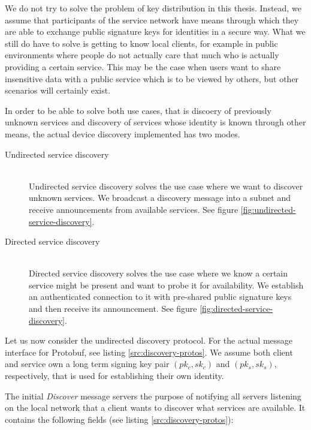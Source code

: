 We do not try to solve the problem of key distribution in this thesis.
Instead, we assume that participants of the service network have means through which they are able to exchange public signature keys for identities in a secure way.
What we still do have to solve is getting to know local clients, for example in public environments where people do not actually care that much who is actually providing a certain service.
This may be the case when users want to share insensitive data with a public service which is to be viewed by others, but other scenarios will certainly exist.

In order to be able to solve both use cases, that is discoery of previously unknown services and discovery of services whose identity is known through other means, the actual device discovery implemented has two modes.
\begin{description}
    \item[Undirected service discovery]\hfill\\
        Undirected service discovery solves the use case where we want to discover unknown services.
        We broadcast a discovery  message into a subnet and receive announcements from available services.
        See figure \ref{fig:undirected-service-discovery}.
    \item[Directed service discovery]\hfill\\
        Directed service discovery solves the use case where we know a certain service might be present and want to probe it for availability.
        We establish an authenticated connection to it with pre-shared public signature keys and then receive its announcement.
        See figure \ref{fig:directed-service-discovery}.
\end{description}

Let us now consider the undirected discovery protocol.
For the actual message interface for Protobuf, see listing \ref{src:discovery-protos}.
We assume both client and service own a long term signing key pair $(pk_c, sk_c)$ and $(pk_s, sk_s)$, respectively, that is used for establishing their own identity.

The initial \emph{Discover} message servers the purpose of notifying all servers listening on the local network that a client wants to discover what services are available.
It contains the following fields (see listing \ref{src:discovery-protos}):


